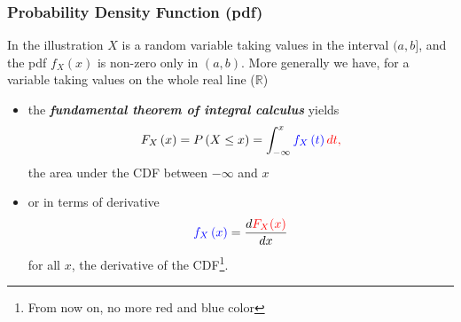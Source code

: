 \documentclass[notes=show,smaller,handout]{beamer}\usepackage[]{graphicx}\usepackage[]{color}
\renewcommand{\Pr}{P}
\newenvironment{stepitemize}{\begin{itemize}[<+->]}{\end{itemize} }
\begin{document}
%
%
%
%

\begin{frame}%

\frametitle{Probability Density Function (pdf)}

In the illustration $X$ is a random variable taking values in the interval $(a,b]$, and the pdf $f_{X}\left( x\right) $ is non-zero only in $(a,b)$. More generally we have, for a variable taking values on the whole real line ($\mathbb{R}$) \vspace{0.3cm}
\begin{stepitemize}
\item the \textbf{\emph{fundamental theorem of integral calculus}} yields
\color{red}
$$F_{X}\left( x\right) =\Pr \left( X\leq x\right) =\int_{-\infty}^{x}\color{blue}f_{X}\left(
t\right)\color{red} dt,$$%
\color{black}
the area under the CDF between $-\infty$ and $x$ \vspace{0.3cm}

\item or in terms of derivative
$$
\color{blue}f_{X}\left( x\right) \color{black} = \frac{d\color{red}F_{X}(x) \color{black}}{\color{black} dx}
$$
for all $x$, the derivative of the CDF\footnote{From now on, no more red and blue color}.
\end{stepitemize}




\end{frame}%
\end{document}
